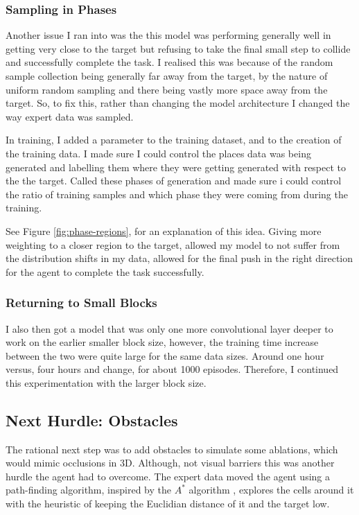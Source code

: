 \subsubsection{Sampling in Phases}
Another issue I ran into was the this model was performing generally well in getting very close to the target but refusing to take the final small step to collide and successfully complete the task. I realised this was because of the random sample collection being generally far away from the target, by the nature of uniform random sampling and there being vastly more space away from the target. So, to fix this, rather than changing the model architecture I changed the way expert data was sampled.

In training, I added a parameter to the training dataset, and to the creation of the training data. I made sure I could control the places data was being generated and labelling them where they were getting generated with respect to the the target. Called these phases of generation and made sure i could control the ratio of training samples and which phase they were coming from during the training. 

See Figure \ref{fig:phase-regions}, for an explanation of this idea. Giving more weighting to a closer region to the target, allowed my model to not suffer from the distribution shifts in my data, allowed for the final push in the right direction for the agent to complete the task successfully.


\subsubsection{Returning to Small Blocks}
I also then got a model that was only one more convolutional layer deeper to work on the earlier smaller block size, however, the training time increase between the two were quite large for the same data sizes. Around one hour versus, four hours and change, for about 1000 episodes. Therefore, I continued this experimentation with the larger block size.

\subsection{Next Hurdle: Obstacles}
The rational next step was to add obstacles to simulate some ablations, which would mimic occlusions in 3D. Although, not visual barriers this was another hurdle the agent had to overcome. The expert data moved the agent using a path-finding algorithm, inspired by the $A^*$ algorithm \cite{cui2011based}, explores the cells around it with the heuristic of keeping the Euclidian distance of it and the target low. 

